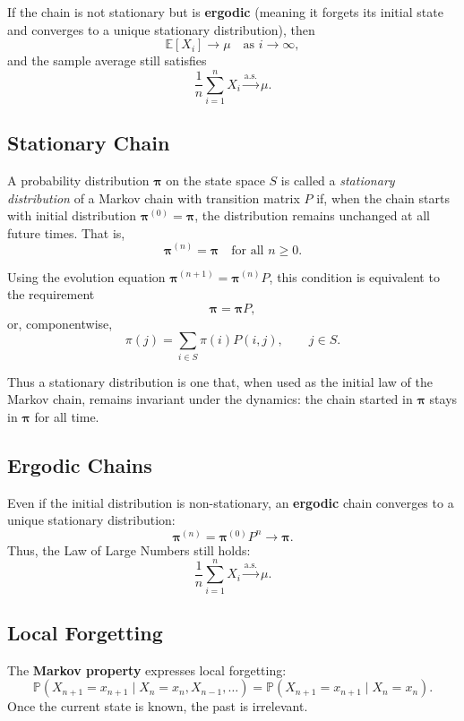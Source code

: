 If the chain is not stationary but is \textbf{ergodic} (meaning it forgets its
initial state and converges to a unique stationary distribution), then
\[
\mathbb{E}[X_i] \to \mu \quad \text{as } i \to \infty,
\]
and the sample average still satisfies
\[
\frac{1}{n} \sum_{i=1}^{n} X_i \xrightarrow{\text{a.s.}} \mu.
\]

\subsection{Stationary Chain}
A probability distribution $\boldsymbol{\pi}$ on the state space $S$ is called a
\emph{stationary distribution} of a Markov chain with transition matrix $P$ if,
when the chain starts with initial distribution $\boldsymbol{\pi}^{(0)} =
\boldsymbol{\pi}$, the distribution remains unchanged at all future times. That is,
\[
\boldsymbol{\pi}^{(n)} = \boldsymbol{\pi} \quad \text{for all } n \ge 0.
\]

Using the evolution equation $\boldsymbol{\pi}^{(n+1)} = \boldsymbol{\pi}^{(n)} P$,
this condition is equivalent to the requirement
\[
\boldsymbol{\pi} = \boldsymbol{\pi}P,
\]
or, componentwise,
\[
\pi(j) = \sum_{i \in S} \pi(i) P(i,j), \qquad j \in S.
\]

Thus a stationary distribution is one that, when used as the initial law of the
Markov chain, remains invariant under the dynamics: the chain started in
$\boldsymbol{\pi}$ stays in $\boldsymbol{\pi}$ for all time.





\subsection{Ergodic Chains}

Even if the initial distribution is non-stationary, an \textbf{ergodic} chain converges to a unique stationary distribution:
\[
\boldsymbol{\pi}^{(n)} = \boldsymbol{\pi}^{(0)} P^n \to \boldsymbol{\pi}.
\]
Thus, the Law of Large Numbers still holds:
\[
\frac{1}{n} \sum_{i=1}^{n} X_i \xrightarrow{\text{a.s.}} \mu.
\]


\subsection{Local Forgetting}

The \textbf{Markov property} expresses local forgetting:
\[
\mathbb{P}(X_{n+1} = x_{n+1} \mid X_n = x_n, X_{n-1}, \dots)
= \mathbb{P}(X_{n+1} = x_{n+1} \mid X_n = x_n).
\]
Once the current state is known, the past is irrelevant.


